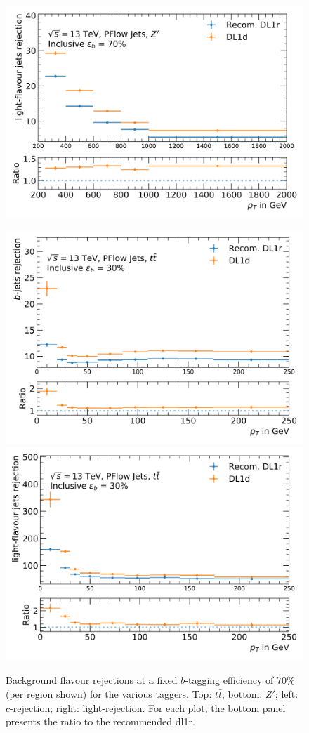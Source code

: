 \begin{center}
\begin{figure}[h!]
{  \includegraphics[scale=0.425]{Images/FTAG/DL1d/perpT/zpbu.png}
}
\caption{Background flavour rejections at a fixed $b$-tagging efficiency of 70\% (per region shown) for the various taggers. Top: $t\bar{t}$; bottom: $Z'$; left: $c$-rejection; right: light-rejection. For each plot, the bottom panel presents the ratio to the recommended \gls{dl1r}.}
\label{fig:ptDL1dtt}
\bigskip
\centerline{
\includegraphics[scale=0.425]{Images/FTAG/DL1d/perpT/ttcb.png}
\includegraphics[scale=0.425]{Images/FTAG/DL1d/perpT/ttcu.png}}

\end{figure}
\end{center}
